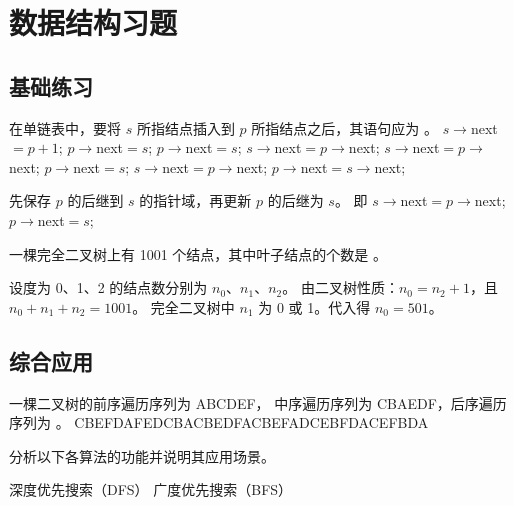 \chapter{数据结构习题}

\section{基础练习}

\begin{qitems}[showanalysis]

    \begin{bbox}
        \qitem 在单链表中，要将 $s$ 所指结点插入到 $p$ 所指结点之后，其语句应为 \blankbox 。
        \fourchoices
            {$s\rightarrow$next$=p+1$; $p\rightarrow$next$=s$;}
            {$p\rightarrow$next$=s$; $s\rightarrow$next$=p\rightarrow$next;}
            {$s\rightarrow$next$=p\rightarrow$next; $p\rightarrow$next$=s$;}
            {$s\rightarrow$next$=p\rightarrow$next; $p\rightarrow$next$=s\rightarrow$next;}
        \begin{analysis}
            先保存 $p$ 的后继到 $s$ 的指针域，再更新 $p$ 的后继为 $s$。
            即 $s\rightarrow$next$=p\rightarrow$next; $p\rightarrow$next$=s$;
        \end{analysis}
    \end{bbox}

    \begin{bbox}
        \qitem 一棵完全二叉树上有 1001 个结点，其中叶子结点的个数是 \blankbox 。
        \begin{analysis}
            设度为 0、1、2 的结点数分别为 $n_0$、$n_1$、$n_2$。
            由二叉树性质：$n_0 = n_2 + 1$，且 $n_0 + n_1 + n_2 = 1001$。
            完全二叉树中 $n_1$ 为 0 或 1。代入得 $n_0 = 501$。
        \end{analysis}
    \end{bbox}

\end{qitems}

\section{综合应用}

\begin{qitems}[startnum=3]

    \begin{bbox}
         一棵二叉树的前序遍历序列为 ABCDEF，
        中序遍历序列为 CBAEDF，后序遍历序列为 \blankbox 。
        \sixchoices
            {CBEFDA}{FEDCBA}{CBEDFA}{CBEFAD}{CEBFDA}{CEFBDA}
    \end{bbox}

    \begin{bbox}
        \qitem 分析以下各算法的功能并说明其应用场景。
        \begin{subqitems}
            \subqitem 深度优先搜索（DFS）
            \subqitem 广度优先搜索（BFS）
        \end{subqitems}
    \end{bbox}

\end{qitems}
